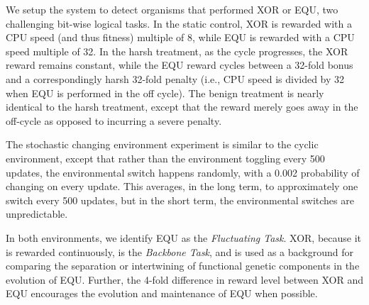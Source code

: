 \documentclass[letterpaper]{article}
\begin{document}
We setup the system to detect organisms that performed XOR or EQU, two challenging bit-wise logical tasks.
In the static control, %
XOR is rewarded with a CPU speed (and thus fitness) multiple of 8, while EQU is rewarded with a CPU speed multiple of 32. %
In the harsh treatment, as the cycle progresses, the XOR reward remains constant, while the EQU reward cycles between a 32-fold bonus and a correspondingly harsh 32-fold penalty (i.e., CPU speed is divided by 32 when EQU is performed in the off cycle). The benign treatment is nearly identical to the harsh treatment, except that the reward merely goes away in the off-cycle as opposed to incurring a severe penalty.

The stochastic changing environment experiment is similar to the cyclic environment, except that rather than the environment
toggling
every 500 updates, the environmental switch happens randomly, with a 0.002
probability of changing on every update. This averages, in the long term, to approximately one switch every 500 updates,
but in the short term, the environmental switches are unpredictable.

In both environments,%
we identify EQU as the \textit{Fluctuating Task}. XOR, because it is rewarded continuously, is the \textit{Backbone Task}, and is used as a background for comparing the separation or intertwining of functional genetic components in the evolution of EQU. Further, the 4-fold difference in reward level between XOR and EQU encourages the evolution and maintenance of EQU when possible.
\end{document}
